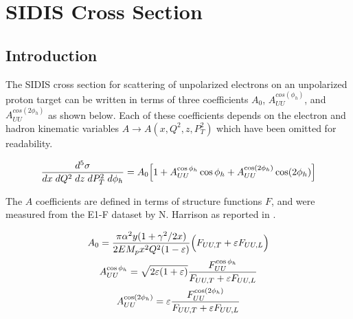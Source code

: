 %
%
%
%
 

\chapter{SIDIS Cross Section}

\section{Introduction}
The SIDIS cross section for scattering of unpolarized electrons on an unpolarized proton target can be written in terms of three coefficients $A_{0}$, $A_{UU}^{cos(\phi_h)}$, and $A_{UU}^{cos(2\phi_h)}$ as shown below.  Each of these coefficients depends on the electron and hadron kinematic variables $A \rightarrow A(x, Q^2, z, P_T^2)$ which have been omitted for readability.

\begin{equation}
	\frac{d^5\sigma}{dx \; dQ^2 \; dz \; dP_T^2 \; d\phi_h} = A_{0} \Bigl[ 1 + A_{UU}^{\cos\phi_h} \cos\phi_h + A_{UU}^{\cos(2\phi_h)} \cos(2\phi_h) \Bigr]
\end{equation}

The $A$ coefficients are defined in terms of structure functions $F$, and were measured from the E1-F dataset by N. Harrison as reported in \cite{thesis-harrison:2015}.   

\begin{gather}
	A_{0} = \frac{\pi \alpha^2 y (1+\gamma^2/2x)}{2 E M_p x^2 Q^2 (1-\varepsilon)} \Bigl( F_{UU,T} + \varepsilon F_{UU,L} \Bigr) \\
	A_{UU}^{\cos\phi_h} = \sqrt{2\varepsilon(1+\varepsilon)} \frac{F_{UU}^{\cos\phi_h}}{F_{UU,T} + \varepsilon F_{UU,L}} \\
	A_{UU}^{\cos(2\phi_h)} = \varepsilon \frac{F_{UU}^{\cos(2\phi_h)}}{F_{UU,T} + \varepsilon F_{UU,L}}
	\label{eqn:a-coefficients}
\end{gather}

